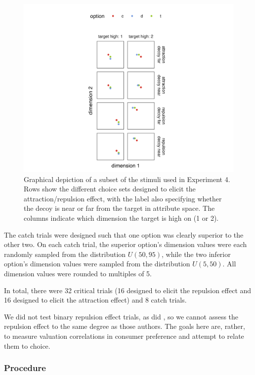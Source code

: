 \begin{figure}
    \includegraphics{figures/ce_rating_stim_for_paper.jpeg}
    \caption{Graphical depiction of a subset of the stimuli used in Experiment 4. Rows show the different choice sets designed to elicit the attraction/repulsion effect, with the label also specifying whether the decoy is near or far from the target in attribute space. The columns indicate which dimension the target is high on (1 or 2).}
    \label{fig:ce_rating_stim}
\end{figure}

The catch trials were designed such that one option was clearly superior to the other two. On each catch trial, the superior option's dimension values were each randomly sampled from the distribution $U(50,95)$, while the two inferior option's dimension values were sampled from the distribution $U(5,50)$. All dimension values were rounded to multiples of 5. 

In total, there were 32 critical trials (16 designed to elicit the repulsion effect and 16 designed to elicit the attraction effect) and 8 catch trials.

We did not test binary repulsion effect trials, as did \textcite{banerjeeFactorsThatPromote2024}, so we cannot assess the repulsion effect to the same degree as those authors. The goals here are, rather, to measure valuation correlations in consumer preference and attempt to relate them to choice.

\subsubsection{Procedure}

